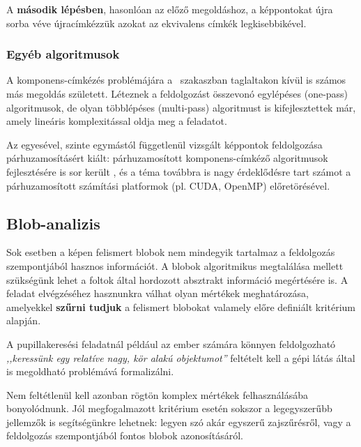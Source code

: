 A \textbf{második lépésben}, hasonlóan az előző megoldáshoz, a képpontokat újra sorba véve újracímkézzük azokat az ekvivalens címkék legkisebbikével.

\subsubsection{Egyéb algoritmusok}\label{sect:blob_egyeb}

A komponens-címkézés problémájára a ~szakaszban taglaltakon kívül is számos más megoldás született. Léteznek a feldolgozást összevonó egylépéses (one-pass) algoritmusok, de olyan többlépéses (multi-pass) algoritmust is kifejlesztettek már, amely lineáris komplexitással oldja meg a feladatot. \cite{suzuki_lin}

Az egyesével, szinte egymástól függetlenül vizsgált képpontok feldolgozása párhuzamosításért kiált: párhuzamosított komponens-címkéző algoritmusok fejlesztésére is sor került \cite{comp_parallel}, és a téma továbbra is nagy érdeklődésre tart számot a párhuzamosított számítási platformok (pl. CUDA, OpenMP) előretörésével.

\subsection{Blob-analizis}\label{sect:blob_analizis}

Sok esetben a képen felismert blobok nem mindegyik tartalmaz a feldolgozás szempontjából hasznos információt. A blobok algoritmikus megtalálása mellett szükségünk lehet a foltok által hordozott absztrakt információ megértésére is. A feladat elvégzéséhez hasznunkra válhat olyan mértékek meghatározása, amelyekkel \textbf{szűrni tudjuk} a felismert blobokat valamely előre definiált kritérium alapján.

A pupillakeresési feladatnál például az ember számára könnyen feldolgozható \emph{,,keressünk egy relatíve nagy, kör alakú objektumot''} feltételt kell a gépi látás által is megoldható problémává formalizálni.

Nem feltétlenül kell azonban rögtön komplex mértékek felhasználásába bonyolódnunk. Jól megfogalmazott kritérium esetén sokszor a legegyszerűbb jellemzők is segítségünkre lehetnek: legyen szó akár egyszerű zajszűrésről, vagy a feldolgozás szempontjából fontos blobok azonosításáról.

